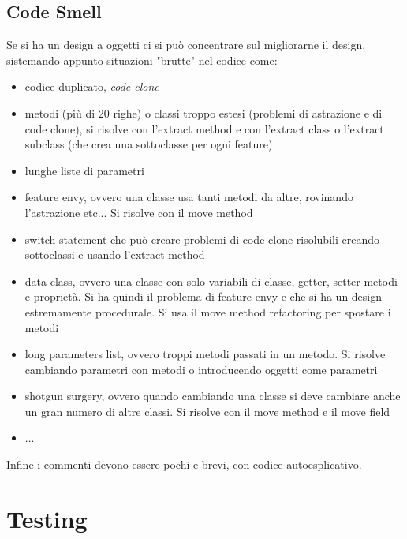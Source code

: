 \documentclass[a4paper,12pt, oneside]{book}
\begin{document}
\section{Code Smell}
Se si ha un design a oggetti ci si può concentrare sul migliorarne il design, sistemando appunto situazioni "brutte" nel codice come:
\begin{itemize}
\item codice duplicato, \textit{code clone}
\item metodi (più di 20 righe) o classi troppo estesi (problemi di astrazione e di code clone), si risolve con l'extract method e con l'extract class o l'extract subclass (che crea una sottoclasse per ogni feature)
\item lunghe liste di parametri
\item feature envy, ovvero una classe usa tanti metodi da altre, rovinando l'astrazione etc... Si risolve con il move method
\item switch statement che può creare problemi di code clone risolubili creando sottoclassi e usando l'extract method
\item data class, ovvero una classe con solo variabili di classe, getter, setter metodi e proprietà. Si ha quindi il problema di feature envy e che si ha un design estremamente procedurale. Si usa il move method refactoring per spostare i metodi
\item long parameters list, ovvero troppi metodi passati in un metodo. Si risolve cambiando parametri con metodi o introducendo oggetti come parametri
\item shotgun surgery, ovvero quando cambiando una classe si deve cambiare anche un gran numero di altre classi. Si risolve con il move method e il move field
\item ...
\end{itemize}
Infine i commenti devono essere pochi e brevi, con codice autoesplicativo.
\chapter{Testing}
\end{document}
